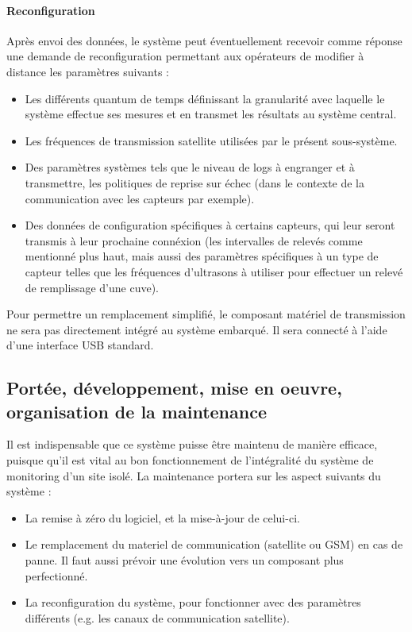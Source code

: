 \paragraph{Reconfiguration} Après envoi des données, le système peut éventuellement recevoir comme réponse une demande de reconfiguration permettant aux opérateurs de modifier à distance les paramètres suivants :

\begin{itemize}
\item Les différents quantum de temps définissant la granularité avec laquelle le système effectue ses mesures et en transmet les résultats au système central.
\item Les fréquences de transmission satellite utilisées par le présent sous-système.
\item Des paramètres systèmes tels que le niveau de logs à engranger et à transmettre, les politiques de reprise sur échec (dans le contexte de la communication avec les capteurs par exemple).
\item Des données de configuration spécifiques à certains capteurs, qui leur seront transmis à leur prochaine connéxion (les intervalles de relevés comme mentionné plus haut, mais aussi des paramètres spécifiques à un type de capteur telles que les fréquences d'ultrasons à utiliser pour effectuer un relevé de remplissage d'une cuve).
\end{itemize}

Pour permettre un remplacement simplifié, le composant matériel de transmission ne sera pas directement intégré au système embarqué. Il sera connecté à l'aide d'une interface USB standard.

\subsection{Portée, développement, mise en oeuvre, organisation de la maintenance}

Il est indispensable que ce système puisse être maintenu de manière efficace, puisque qu'il est vital au bon fonctionnement de l'intégralité du système de monitoring d'un site isolé. La maintenance portera sur les aspect suivants du système :

\begin{itemize}
\item La remise à zéro du logiciel, et la mise-à-jour de celui-ci.
\item Le remplacement du materiel de communication (satellite ou GSM) en cas de panne. Il faut aussi prévoir une évolution vers un composant plus perfectionné.\footnotemark
\item La reconfiguration du système, pour fonctionner avec des paramètres différents (e.g. les canaux de communication satellite).
\end{itemize}

